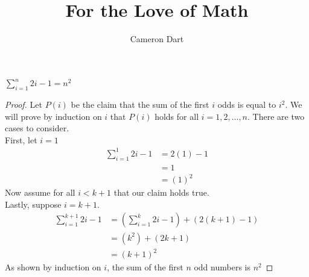 \documentclass[12pt]{article}
\newenvironment{claim}[2][Claim]{\begin{trivlist}
		\item[\hskip \labelsep {\bfseries #1}\hskip \labelsep {\bfseries #2}]}{\end{trivlist}}
\begin{document}
	\title{For the Love of Math}
	\author{Cameron Dart}
	\maketitle

	\begin{claim}{}
		$\sum_{i = 1}^{n} 2i - 1 = n^2$
	\end{claim}
	\begin{proof}
		Let $P(i)$ be the claim that the sum of the first $i$ odds is equal to $i^2$. We will prove by induction on $i$ that $P(i)$ holds for all $i = 1,2,...,n$. There are two cases to consider.\\
		First, let $i = 1$
		\begin{align*}
			\sum_{i = 1}^{1} 2i - 1 & = 2 (1) - 1 \\
			&= 1 \\
			&= (1)^2
		\end{align*}
		Now assume for all $i < k + 1$ that our claim holds true.\\ 
		Lastly,  suppose $i = k + 1$.
		\begin{align*}
			\sum_{i = 1} ^ {k + 1} 2i - 1 &= \left(\sum_{i = 1} ^ {k} 2i - 1 \right)+ (2(k + 1) - 1) \\
			&= (k^2) + (2k + 1) \\
			&= (k + 1) ^ 2
		\end{align*} 
		As shown by induction on $i$, the sum of the first $n$ odd numbers is $n^2$
	\end{proof}
\end{document}
